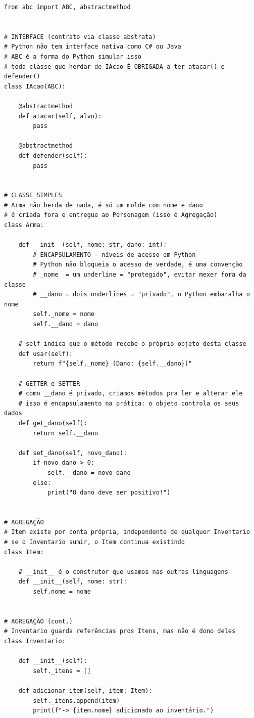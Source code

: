 \begin{lstlisting}[style=python, caption={Exemplo de Aplicação de POO em Python}]
from abc import ABC, abstractmethod


# INTERFACE (contrato via classe abstrata)
# Python não tem interface nativa como C# ou Java
# ABC é a forma do Python simular isso
# toda classe que herdar de IAcao É OBRIGADA a ter atacar() e defender()
class IAcao(ABC):

    @abstractmethod
    def atacar(self, alvo):
        pass

    @abstractmethod
    def defender(self):
        pass


# CLASSE SIMPLES
# Arma não herda de nada, é só um molde com nome e dano
# é criada fora e entregue ao Personagem (isso é Agregação)
class Arma:

    def __init__(self, nome: str, dano: int):
        # ENCAPSULAMENTO - níveis de acesso em Python
        # Python não bloqueia o acesso de verdade, é uma convenção
        # _nome  = um underline = "protegido", evitar mexer fora da classe
        # __dano = dois underlines = "privado", o Python embaralha o nome
        self._nome = nome
        self.__dano = dano

    # self indica que o método recebe o próprio objeto desta classe
    def usar(self):
        return f"{self._nome} (Dano: {self.__dano})"

    # GETTER e SETTER
    # como __dano é privado, criamos métodos pra ler e alterar ele
    # isso é encapsulamento na prática: o objeto controla os seus dados
    def get_dano(self):
        return self.__dano

    def set_dano(self, novo_dano):
        if novo_dano > 0:
            self.__dano = novo_dano
        else:
            print("O dano deve ser positivo!")


# AGREGAÇÃO
# Item existe por conta própria, independente de qualquer Inventario
# se o Inventario sumir, o Item continua existindo
class Item:

    # __init__ é o construtor que usamos nas outras linguagens
    def __init__(self, nome: str):
        self.nome = nome


# AGREGAÇÃO (cont.)
# Inventario guarda referências pros Itens, mas não é dono deles
class Inventario:

    def __init__(self):
        self._itens = []

    def adicionar_item(self, item: Item):
        self._itens.append(item)
        print(f"-> {item.nome} adicionado ao inventário.")


\end{lstlisting}
